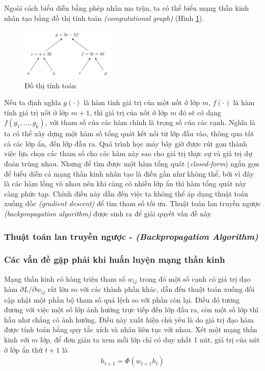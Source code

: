 Ngoài cách biểu diễn bằng phép nhân ma trận, ta có thể biểu mạng thần kinh nhân tạo bằng đồ thị tính toán \textit{(computational graph)} (Hình \ref{figure:computational-graph}).
\begin{figure}[htbp]
    \centering
    \includegraphics[width=0.4\textwidth]{tikz_image/computational_graph.pdf}
    \caption{Đồ thị tính toán}
    \label{figure:computational-graph}
\end{figure}

Nếu ta định nghĩa $g(\cdot)$ là hàm tính giá trị của một nốt ở lớp $m$, $f(\cdot)$ là hàm tính giá trị nốt ở lớp $m+1$, thì  giá trị của nốt ở lớp $m$ đó sẽ có dạng $f(g_1,\dots,g_k)$, với tham số của các hàm chính là trọng số của các cạnh. Nghĩa là ta có thể xây dựng một hàm số tổng quát kết nối từ lớp đầu vào, thông qua tất cả các lớp ẩn, đến lớp đầu ra. Quá trình học máy bây giờ được rút gọn thành việc lựa chọn các tham số cho các hàm này sao cho giá trị thực sự và giá trị dự đoán trùng nhau. Nhưng để tìm được một hàm tổng quát (\textit{closed-form}) ngắn gọn để biểu diễn cả mạng thần kinh nhân tạo là điều gần như không thể, bởi vì đây là các hàm lồng vô nhau nên khi càng có nhiều lớp ẩn thì hàm tổng quát này càng phức tạp. Chính điều này dẫn đến việc ta không thể áp dụng thuật toán xuống dốc \textit{(gradient descent)} để tìm tham số tối ưu. Thuật toán lan truyền ngược \textit{(backpropagation algorithm)} được sinh ra để giải quyết vấn đề này.\cite{Aggarwal2023-zk}

\subsubsection{Thuật toán lan truyền ngược - \textit{(Backpropagation Algorithm)}}


\subsubsection{Các vấn đề gặp phải khi huấn luyện mạng thần kinh}
Mạng thần kinh có hàng triệu tham số $w_{ij}$ trong đó một số cạnh có giá trị đạo hàm $\partial L/\partial w_{ij}$ rất lớn so với các thành phần khác, dẫn đến thuật toán xuống đồi cập nhật một phần bộ tham số quá lệch so với phần còn lại. Điều đó tương đương với việc một số lớp ảnh hưởng trực tiếp đến lớp đầu ra, còn một số lớp thì hầu như chẳng có ảnh hưởng. Điều này xuất hiện chủ yếu là do giá trị đạo hàm được tính toán bằng quy tắc xích và nhân liên tục với nhau. Xét một mạng thần kinh với $m$ lớp, để đơn giản ta xem mỗi lớp chỉ có duy nhất 1 nút, giá trị của nút ở lớp ẩn thứ $t+1$ là
\begin{align}
    h_{t+1}=\Phi(w_{t+1}h_t)
\end{align}

